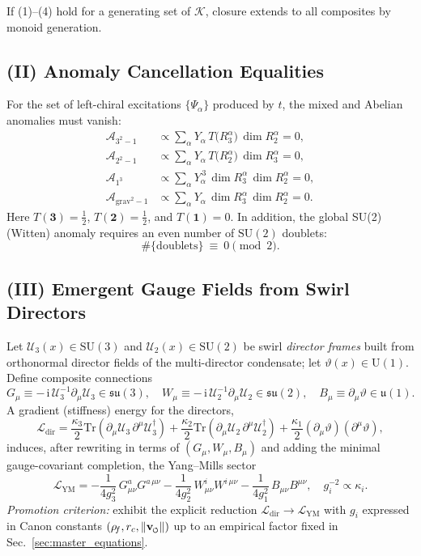 \documentclass[11pt]{article}
\newcommand{\Tr}{\mathrm{Tr}}
\newcommand{\ii}{\mathrm{i}}
\newcommand{\swirlarrow}{%
     \mathchoice{\mkern-2mu\scriptstyle\boldsymbol{\circlearrowleft}}%
                {\mkern-2mu\scriptstyle\boldsymbol{\circlearrowleft}}%
                {\mkern-2mu\scriptscriptstyle\boldsymbol{\circlearrowleft}}%
                {\mkern-2mu\scriptscriptstyle\boldsymbol{\circlearrowleft}}%
}
\newcommand{\vswirl}{\mathbf{v}_{\swirlarrow}}
\begin{document}
\begin{proposition}
	If (1)–(4) hold for a generating set of $\mathcal{K}$, closure extends to all composites by monoid generation.
\end{proposition}

\subsection*{(II) Anomaly Cancellation Equalities}
For the set of left-chiral excitations $\{\Psi_\alpha\}$ produced by $t$, the mixed and Abelian anomalies must vanish:
\begin{align}
	\mathcal A_{3^2-1} &\propto \sum_\alpha Y_\alpha\,T\!\big(R_3^\alpha\big)\,\dim R_2^\alpha = 0,\label{eq:A321}\\
	\mathcal A_{2^2-1} &\propto \sum_\alpha Y_\alpha\,T\!\big(R_2^\alpha\big)\,\dim R_3^\alpha = 0,\label{eq:A221}\\
	\mathcal A_{1^3} &\propto \sum_\alpha Y_\alpha^{\,3}\,\dim R_3^\alpha\,\dim R_2^\alpha = 0,\label{eq:A111}\\
	\mathcal A_{\mathrm{grav}^2-1} &\propto \sum_\alpha Y_\alpha\,\dim R_3^\alpha\,\dim R_2^\alpha = 0.\label{eq:Agrav}
\end{align}
Here $T(\mathbf 3)=\tfrac12$, $T(\mathbf 2)=\tfrac12$, and $T(\mathbf 1)=0$. In addition, the global SU(2) (Witten) anomaly requires an even number of $\mathrm{SU}(2)$ doublets:
\[
	\#\{\text{doublets}\}\ \equiv\ 0 \pmod 2.
\]

\subsection*{(III) Emergent Gauge Fields from Swirl Directors}
Let $\mathcal U_3(x)\in \mathrm{SU}(3)$ and $\mathcal U_2(x)\in \mathrm{SU}(2)$ be swirl \emph{director frames} built from orthonormal director fields of the multi-director condensate; let $\vartheta(x)\in \mathrm{U}(1)$. Define composite connections
\[
	G_\mu \equiv -\,\ii\,\mathcal U_3^{-1}\partial_\mu \mathcal U_3\in\mathfrak{su}(3),\quad
	W_\mu \equiv -\,\ii\,\mathcal U_2^{-1}\partial_\mu \mathcal U_2\in\mathfrak{su}(2),\quad
	B_\mu \equiv \partial_\mu \vartheta \in \mathfrak u(1).
\]
A gradient (stiffness) energy for the directors,
\[
	\mathcal L_{\text{dir}}=\frac{\kappa_3}{2}\Tr(\partial_\mu\mathcal U_3\,\partial^\mu\mathcal U_3^\dagger)
	+\frac{\kappa_2}{2}\Tr(\partial_\mu\mathcal U_2\,\partial^\mu\mathcal U_2^\dagger)
	+\frac{\kappa_1}{2}(\partial_\mu\vartheta)(\partial^\mu\vartheta),
\]
induces, after rewriting in terms of $(G_\mu,W_\mu,B_\mu)$ and adding the minimal gauge-covariant completion, the Yang–Mills sector
\[
	\mathcal L_{\text{YM}}=-\frac{1}{4 g_3^2}\,G_{\mu\nu}^a G^{a\,\mu\nu}
	-\frac{1}{4 g_2^2}\,W_{\mu\nu}^i W^{i\,\mu\nu}
	-\frac{1}{4 g_1^2}\,B_{\mu\nu}B^{\mu\nu},
	\quad
	g_i^{-2}\propto \kappa_i.
\]
\emph{Promotion criterion:} exhibit the explicit reduction $\mathcal L_{\text{dir}}\to\mathcal L_{\text{YM}}$ with $g_i$ expressed in Canon constants $(\rho_{\!f},r_c,\|\vswirl\|)$ up to an empirical factor fixed in Sec.~\ref{sec:master_equations}.
\end{document}
